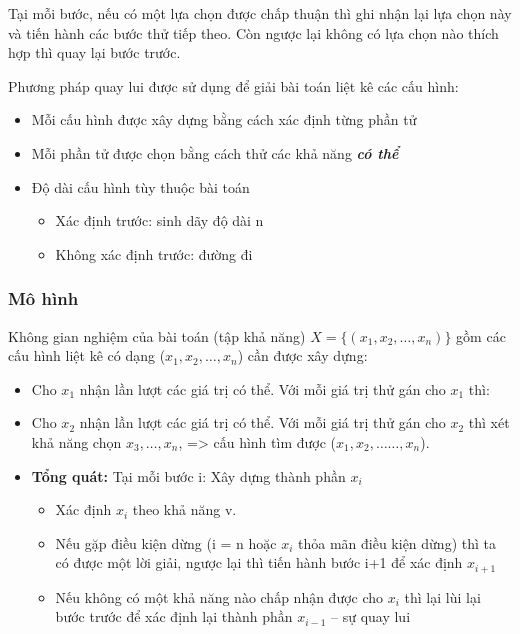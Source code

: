 Tại mỗi bước, nếu có một lựa chọn được chấp thuận thì ghi nhận lại lựa chọn này và tiến hành các bước thử tiếp theo. Còn ngược lại không có lựa chọn nào thích hợp thì quay lại bước trước.

Phương pháp quay lui được sử dụng để giải bài toán liệt kê các cấu hình:
\begin{itemize}
    \item Mỗi cấu hình được xây dựng bằng cách xác định từng phần tử
    \item Mỗi phần tử được chọn bằng cách thử các khả năng \textit{\textbf{có thể}}
    \item Độ dài cấu hình tùy thuộc bài toán
        \begin{itemize}
            \item Xác định trước: sinh dãy độ dài n
            \item Không xác định trước: đường đi
        \end{itemize}
\end{itemize}

\subsubsection{Mô hình}
Không gian nghiệm của bài toán (tập khả năng) $X=\{(x_1,x_2,…,x_n)\}$ gồm các cấu hình liệt kê có dạng ($x_1,x_2,…,x_n$) cần được xây dựng:
\begin{itemize}
    \item Cho $x_1$ nhận lần lượt các giá trị có thể. Với mỗi giá trị thử gán cho $x_1$ thì:
    \item Cho $x_2$ nhận lần lượt các giá trị có thể. Với mỗi giá trị thử gán cho $x_2$ thì xét khả năng chọn $x_3,…, x_n$, => cấu hình tìm được ($x_1, x_2, ……, x_n$).
    \item \textbf{Tổng quát:} Tại mỗi bước i: Xây dựng thành phần $x_i$
    \begin{itemize}
        \item Xác định $x_i$ theo khả năng v.
        \item Nếu gặp điều kiện dừng (i = n hoặc $x_i$ thỏa mãn điều kiện dừng) thì ta có được một lời giải, ngược lại thì tiến hành bước i+1 để xác định $x_{i+1}$
        \item Nếu không có một khả năng nào chấp nhận được cho $x_i$ thì lại lùi lại bước trước để xác định lại thành phần $x_{i-1}$ – sự quay lui
    \end{itemize}
\end{itemize}

